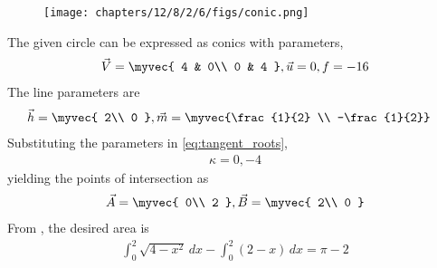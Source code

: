 	\begin{figure}[H]
		\centering
 \texttt{[image: chapters/12/8/2/6/figs/conic.png]}
		\caption{}
		\label{fig:12/8/2/6}
  	\end{figure}
The given circle can be expressed as conics with parameters,
\begin{align}
\vec{V}=\myvec{
4 & 0\\
0 & 4
},
\vec{u}=0,
f=-16
\end{align}
The line parameters are
\begin{align}
\vec{h} &= \myvec{
2\\
0
}, 
\vec{m} = \myvec{\frac{1}{2} \\ -\frac{1}{2}}
\end{align}
Substituting the parameters in \eqref{eq:tangent_roots},
\begin{align}
\kappa =0,-4
\end{align}
yielding the points of intersection as
\begin{align}
    \vec{A}=\myvec{
0\\
2
    },
    \vec{B}=\myvec{
2\\
0
    }
\end{align}
From 
		,
the desired area is
\begin{align}
\int_{0}^{2}\sqrt{4-x^2} \,dx 
-\int_{0}^{2} (2-x) \,dx
=\pi - 2
\end{align}
